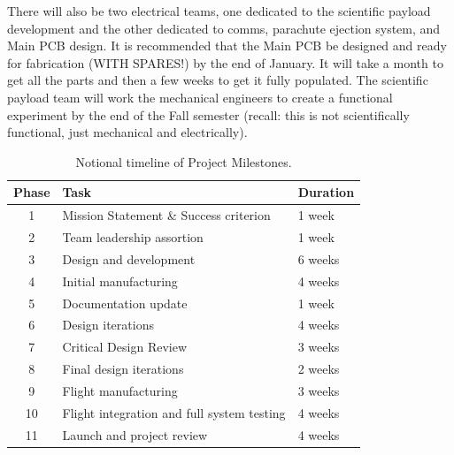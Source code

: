 \documentclass[conference]{IEEEtran} %
\begin{document}
  There will also be two electrical teams, one dedicated to the scientific payload development and the other dedicated to comms, parachute ejection system, and Main PCB design. It is 
  recommended that the Main PCB be designed and ready for fabrication (WITH SPARES!) by the end of January. It will take a month to get all the parts and then a few weeks to get it fully populated. 
  The scientific payload team will work the mechanical engineers to create a functional experiment by the end of the Fall semester (recall: this is not scientifically functional, just mechanical and 
  electrically). 

\begin{table}[hb!]
    \caption{Notional timeline of Project Milestones.}
    \centering
    \begin{tabular}{@{}cll@{}}
    \toprule
    Phase & Task & Duration \\
    \midrule
    1 & Mission Statement \& Success criterion & 1 week \\
    2 & Team leadership assortion & 1 week \\
    3 & Design and development & 6 weeks \\
    4 & Initial manufacturing & 4 weeks \\
    5 & Documentation update & 1 week \\
    6 & Design iterations & 4 weeks \\
    7 & Critical Design Review & 3 weeks \\
    8 & Final design iterations & 2 weeks \\
    9 & Flight manufacturing & 3 weeks \\
    10 & Flight integration and full system testing & 4 weeks \\
    11 & Launch and project review & 4 weeks \\
    \bottomrule
    \end{tabular}
\label{tab:short-example}
\end{table}
\end{document}
